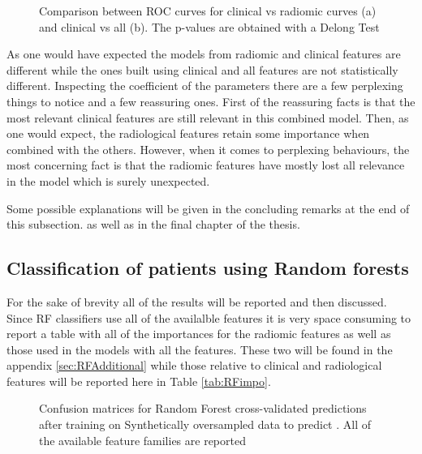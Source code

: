 \begin{figure}[H]
\centering
        \caption{Comparison between ROC curves for clinical vs radiomic curves (a) and clinical vs all (b). The p-values are obtained with a Delong Test }\label{fig:delongDeath}
\end{figure}

As one would have expected the models from radiomic and clinical features are different while the ones built using clinical and all features are not statistically different.
Inspecting the coefficient of the parameters there are a few perplexing things to notice and a few reassuring ones. First of the reassuring facts is that the most relevant clinical features are still relevant in this combined model. 
Then, as one would expect, the radiological features retain some importance when combined with the others. However, when it comes to perplexing behaviours, the most concerning fact is that the radiomic features have mostly lost all relevance in the model which is surely unexpected.

Some possible explanations will be given in the concluding remarks at the end of this  subsection. as well as in the final chapter of the thesis.

\subsection{Classification of patients using Random forests}
For the sake of brevity all of the results will be reported and then discussed. Since RF classifiers use all of the availalble features it is very space consuming to report a table with all of the importances for the radiomic features as well as those used in the models with all the features. These two will be found in the appendix \ref{sec:RFAdditional} while those relative to clinical and radiological features will be reported here in Table \ref{tab:RFimpo}.

\begin{figure}[H]
\centering
	\newline
        \caption{Confusion matrices for Random Forest cross-validated predictions after training on Synthetically oversampled data to predict \death. All of the available feature families are reported}\label{fig:RFDeath}
\end{figure}


